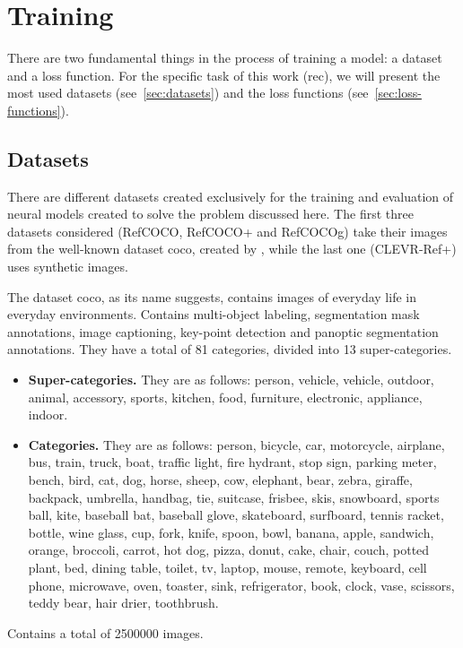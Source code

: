 \section{Training}\label{sec:rec-trainning}

There are two fundamental things in the process of training a model: a dataset
and a loss function. For the specific task of this work (\gls{rec}), we will
present the most used datasets (see\ \vref{sec:datasets}) and the loss functions
(see\ \vref{sec:loss-functions}).


\subsection{Datasets}\label{sec:datasets}

There are different datasets created exclusively for the training and
evaluation of neural models created to solve the problem discussed here. The
first three datasets considered (RefCOCO, RefCOCO+ and RefCOCOg) take their
images from the well-known dataset \gls{coco}, created by
, while the last one (CLEVR-Ref+) uses synthetic images.

The dataset \gls{coco}, as its name suggests, contains images of everyday life
in everyday environments. Contains multi-object labeling, segmentation mask
annotations, image captioning, key-point detection and panoptic segmentation
annotations. They have a total of 81 categories, divided into 13
super-categories.
\begin{itemize}
  \item \textbf{Super-categories.} They are as follows: person, vehicle,
  vehicle, outdoor, animal, accessory, sports, kitchen, food, furniture,
  electronic, appliance, indoor.
  \item \textbf{Categories.} They are as follows: person, bicycle, car,
  motorcycle, airplane, bus, train, truck, boat, traffic light, fire hydrant,
  stop sign, parking meter, bench, bird, cat, dog, horse, sheep, cow, elephant,
  bear, zebra, giraffe, backpack, umbrella, handbag, tie, suitcase, frisbee,
  skis, snowboard, sports ball, kite, baseball bat, baseball glove, skateboard,
  surfboard, tennis racket, bottle, wine glass, cup, fork, knife, spoon, bowl,
  banana, apple, sandwich, orange, broccoli, carrot, hot dog, pizza, donut,
  cake, chair, couch, potted plant, bed, dining table, toilet, tv, laptop,
  mouse, remote, keyboard, cell phone, microwave, oven, toaster, sink,
  refrigerator, book, clock, vase, scissors, teddy bear, hair drier,
  toothbrush.
\end{itemize}
Contains a total of \num{2500000} images.

